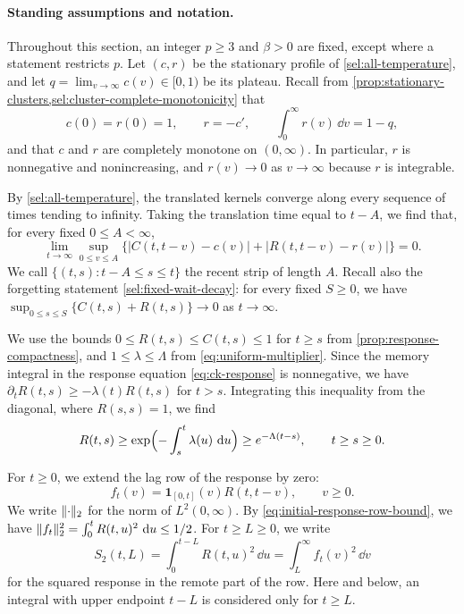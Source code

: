 \paragraph{Standing assumptions and notation.}
Throughout this section, an integer $p\ge3$ and $\beta>0$ are fixed, except where a statement restricts $p$. Let $(c,r)$ be the stationary profile of \cref{sel:all-temperature}, and let $q=\lim_{v\to\infty}c(v)\in[0,1)$ be its plateau. Recall from \cref{prop:stationary-clusters,sel:cluster-complete-monotonicity} that
\[
 c(0)=r(0)=1,\qquad r=-c',\qquad \int_0^\infty r(v)\,\dd v=1-q,
\]
and that $c$ and $r$ are completely monotone on $(0,\infty)$. In particular, $r$ is nonnegative and nonincreasing, and $r(v)\to0$ as $v\to\infty$ because $r$ is integrable.

By \cref{sel:all-temperature}, the translated kernels converge along every sequence of times tending to infinity. Taking the translation time equal to $t-A$, we find that, for every fixed $0\le A<\infty$,
\begin{equation}\label{eq:resp-recent-strip}
 \lim_{t\to\infty}\sup_{0\le v\le A}\bigl\{|C(t,t-v)-c(v)|+|R(t,t-v)-r(v)|\bigr\}=0.
\end{equation}
We call $\{(t,s):t-A\le s\le t\}$ the recent strip of length $A$. Recall also the forgetting statement \eqref{sel:fixed-wait-decay}: for every fixed $S\ge0$, we have $\sup_{0\le s\le S}\{C(t,s)+R(t,s)\}\to0$ as $t\to\infty$.

We use the bounds $0\le R(t,s)\le C(t,s)\le1$ for $t\ge s$ from \cref{prop:response-compactness}, and $1\le\lambda\le\Lambda$ from \eqref{eq:uniform-multiplier}. Since the memory integral in the response equation \eqref{eq:ck-response} is nonnegative, we have $\partial_tR(t,s)\ge-\lambda(t)R(t,s)$ for $t>s$. Integrating this inequality from the diagonal, where $R(s,s)=1$, we find
\begin{equation}\label{eq:resp-response-lower}
 R(t,s)\ge\exp\Bigl(-\int_s^t\lambda(u)\,\mathop{}\!\mathrm d u\Bigr)\ge e^{-\Lambda(t-s)},\qquad t\ge s\ge0.
\end{equation}

For $t\ge0$, we extend the lag row of the response by zero:
\begin{equation}
 f_t(v)=\mathbf1_{[0,t]}(v)R(t,t-v),\qquad v\ge0.
 \label{resp:lag-row}
\end{equation}
We write $\lVert\cdot\rVert_2$ for the norm of $L^2(0,\infty)$. By \eqref{eq:initial-response-row-bound}, we have $\lVert f_t\rVert_2^2=\int_0^tR(t,u)^2\,\mathop{}\!\mathrm d u\le1/2$. For $t\ge L\ge0$, we write
\[
 S_2(t,L)=\int_0^{t-L}R(t,u)^2\,\dd u=\int_L^\infty f_t(v)^2\,\dd v
\]
for the squared response in the remote part of the row. Here and below, an integral with upper endpoint $t-L$ is considered only for $t\ge L$.

